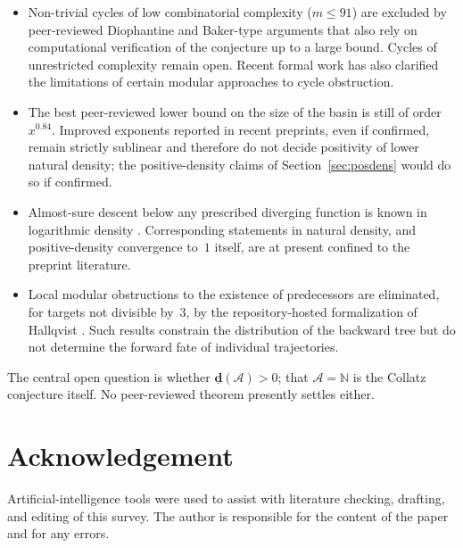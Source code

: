 \documentclass[11pt,reqno,oneside]{amsart}
\newcommand{\N}{\mathbb{N}}
\begin{document}
\begin{itemize}[leftmargin=1.5em]
\item Non-trivial cycles of low combinatorial complexity ($m\le 91$) are excluded by peer-reviewed Diophantine and Baker-type arguments that also rely on computational verification of the conjecture up to a large bound. Cycles of unrestricted complexity remain open. Recent formal work has also clarified the limitations of certain modular approaches to cycle obstruction.
\item The best peer-reviewed lower bound on the size of the basin is still of order $x^{0.84}$. Improved exponents reported in recent preprints, even if confirmed, remain strictly sublinear and therefore do not decide positivity of lower natural density; the positive-density claims of Section~\ref{sec:posdens} would do so if confirmed.
\item Almost-sure descent below any prescribed diverging function is known in logarithmic density \cite{Tao22}. Corresponding statements in natural density, and positive-density convergence to~$1$ itself, are at present confined to the preprint literature.
\item Local modular obstructions to the existence of predecessors are eliminated, for targets not divisible by~$3$, by the repository-hosted formalization of Hallqvist \cite{Hallqvist26}. Such results constrain the distribution of the backward tree but do not determine the forward fate of individual trajectories.
\end{itemize}

The central open question is whether $\underline{\mathbf{d}}(\mathcal{A})>0$; that $\mathcal{A}=\N$ is the Collatz conjecture itself. No peer-reviewed theorem presently settles either.

\section*{Acknowledgement}
Artificial-intelligence tools were used to assist with literature checking, drafting, and editing of this survey. The author is responsible for the content of the paper and for any errors.
\end{document}
